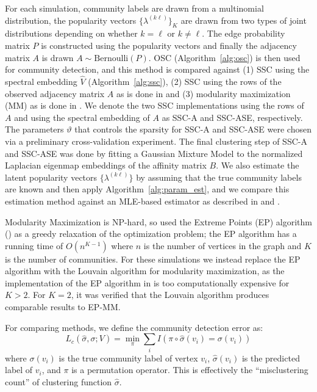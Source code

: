 \documentclass[12pt]{article}
\begin{document}
For each simulation, community labels are drawn from a multinomial
distribution, the popularity vectors \(\{\lambda^{(k \ell)}\}_K\) are drawn
from two types of joint distributions depending on whether \(k =
\ell\) or $k \not = \ell$. The edge probability matrix \(P\) is constructed using the popularity
vectors and finally the adjacency matrix \(A\)
is drawn \(A \sim \mathrm{Bernoulli}(P)\). OSC (Algorithm~\ref{alg:osc}) is then used for community detection, and this
method is compared against (1) SSC using the spectral embedding $\hat{V}$
(Algorithm~\ref{alg:ssc}), (2) SSC using the rows of the
observed adjacency matrix $A$ as is done in \citet{noroozi2019estimation}
and (3) modularity maximization (MM) as is done in
\citet{307cbeb9b1be48299388437423d94bf1}. We denote the two SSC
implementations using the rows of $A$ and using the spectral embedding
of $A$ as SSC-A and SSC-ASE, respectively. The parameters \(\vartheta\)
that controls the sparsity for SSC-A and SSC-ASE were chosen via a preliminary cross-validation
experiment. The final clustering step of SSC-A and SSC-ASE was done
by fitting a Gaussian Mixture Model to the normalized Laplacian
eigenmap embeddings \citep{belkin03:_laplac} of the affinity matrix \(B\).
We also estimate the latent popularity vectors $\{\lambda^{(k \ell)}\}$
by assuming that the true community labels are known and then apply
Algorithm~\ref{alg:param_est}, and we compare this estimation method against an
MLE-based estimator as described in \citet{noroozi2019estimation} and
\citet{307cbeb9b1be48299388437423d94bf1}.

Modularity Maximization is NP-hard, so
\citet{307cbeb9b1be48299388437423d94bf1} used the Extreme Points
(EP) algorithm (\cite{le2016}) as a greedy
relaxation of the optimization problem; the EP algorithm has a running
time of $O(n^{K-1})$ where $n$ is the number of vertices in the graph
and $K$ is the number of communities.
For these simulations we instead replace the EP algorithm with the
Louvain algorithm for modularity maximization,
as the implementation of the EP algorithm in
\citet{307cbeb9b1be48299388437423d94bf1} is too computationally expensive for \(K > 2\). For \(K = 2\), it
was verified that the Louvain algorithm produces comparable results
to EP-MM.

For comparing methods, we define the community detection error as:
\[L_c(\hat{\sigma}, \sigma; V) =
\min_\pi \sum_i I(\pi \circ \hat{\sigma}(v_i) = \sigma(v_i))\]
where \(\sigma(v_i)\) is the true community label of vertex \(v_i\),
\(\hat{\sigma}(v_i)\) is the predicted label of \(v_i\), and \(\pi\) is
a permutation operator. This is effectively the ``misclustering count''
of clustering function \(\hat{\sigma}\).
\end{document}

